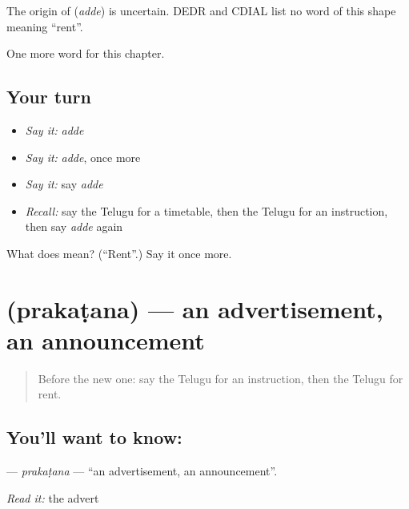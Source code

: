 \begin{cousinweb}
The origin of \textbf{} (\emph{adde}) is uncertain. DEDR and CDIAL list no word of this shape meaning \textquotedblleft{}rent\textquotedblright{}.
\end{cousinweb}

\begin{grammarlens}[title={What you've built}]
One more word for this chapter.
\end{grammarlens}

\subsection*{Your turn}
\begin{itemize}
\raggedright
  \item \emph{Say it:} \emph{adde}
  \item \emph{Say it:} \emph{adde}, once more
  \item \emph{Say it:} say \emph{adde}
  \item \emph{Recall:} say the Telugu for a timetable, then the Telugu for an instruction, then say \emph{adde} again
\end{itemize}

\begin{tcolorbox}[breakable,colback=teal!4,colframe=teal!35!black,title={Before you move on}]
What does  mean? (\textquotedblleft{}Rent\textquotedblright{}.) Say it once more.
\end{tcolorbox}
\section[\texorpdfstring{\te{ప్రకటన} (prakaṭana)}{ప్రకటన (prakaṭana)}]{ (prakaṭana) — an advertisement, an announcement}

\label{lesson:TE-C156-prakatana}



\begin{quote}
Before the new one: say the Telugu for an instruction, then the Telugu for rent.
\end{quote}

\subsection*{You'll want to know: }
\textbf{} — \emph{prakaṭana} — \textquotedblleft{}an advertisement, an announcement\textquotedblright{}.

\emph{Read it:} the advert

